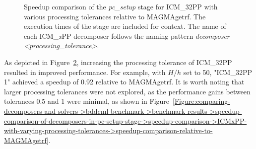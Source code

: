 \begin{figure}[ht!]
\begin{subfigure}{\textwidth}
		\label{Figure:comparing-decomposers-and-solvers->bddcml-benchmark->benchmark-results->speedup-comparison-of-decomposers-in-pc-setup-stage->speedup-comparison->ICMxPP-with-varying-processing-tolerances->pc-setup-time-with-MAGMAgetrf}
	\end{subfigure}
	\caption{Speedup comparison of the \textit{pc\_setup} stage for ICM\_32PP with various processing tolerances relative to MAGMAgetrf. The execution times of the stage are included for context. The name of each ICM\_\textit{x}PP decomposer follows the naming pattern \textit{decomposer <processing\_tolerance>}.}
	\label{Figure:comparing-decomposers-and-solvers->bddcml-benchmark->benchmark-results->speedup-comparison-of-decomposers-in-pc-setup-stage->speedup-comparison->ICMxPP-with-varying-processing-tolerances->speedup-comparison-relative-to-MAGMAgetrf-and-pc-setup-execution-time}
\end{figure}

As depicted in Figure~\ref{Figure:comparing-decomposers-and-solvers->bddcml-benchmark->benchmark-results->speedup-comparison-of-decomposers-in-pc-setup-stage->speedup-comparison->ICMxPP-with-varying-processing-tolerances->speedup-comparison-relative-to-MAGMAgetrf-and-pc-setup-execution-time}, increasing the processing tolerance of ICM\_32PP resulted in  improved performance. For example, with $H/h$ set to 50, "ICM\_32PP 1" achieved a speedup of 0.92 relative to MAGMAgetrf. It is worth noting that larger processing tolerances were not explored, as the performance gains between tolerances 0.5 and 1 were minimal, as shown in Figure~\ref{Figure:comparing-decomposers-and-solvers->bddcml-benchmark->benchmark-results->speedup-comparison-of-decomposers-in-pc-setup-stage->speedup-comparison->ICMxPP-with-varying-processing-tolerances->speedup-comparison-relative-to-MAGMAgetrf}.

